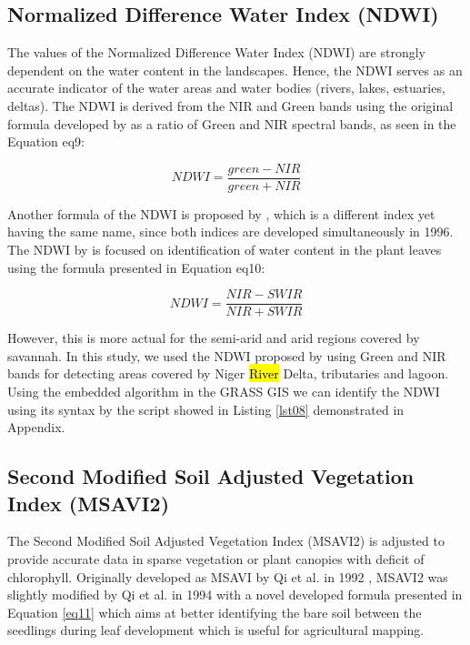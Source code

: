 \documentclass[jmse,article,submit,pdftex,moreauthors]{Definitions/mdpi}
\begin{document}
\subsection{Normalized Difference Water Index (NDWI)}

The values of the Normalized Difference Water Index (NDWI) are strongly dependent on the water content in the landscapes. Hence, the NDWI serves as an accurate indicator of the water areas and water bodies (rivers, lakes, estuaries, deltas). The NDWI is derived from the NIR and Green bands using the original formula developed by \cite{McFeeters} as a ratio of Green and NIR spectral bands, as seen in the Equation {eq9}: 

\begin{equation}\label{eq9}
	NDWI = \frac{green - NIR}{green + NIR}
\end{equation} 

Another formula of the NDWI is proposed by \cite{GAO1996257}, which is a different index yet having the same name, since both indices are developed simultaneously in 1996. The NDWI by \cite{GAO1996257} is focused on identification of water content in the plant leaves using the formula presented in Equation {eq10}: 

\begin{equation}\label{eq10}
	NDWI = \frac{NIR - SWIR}{NIR + SWIR}
\end{equation} 

However, this is more actual for the semi-arid and arid regions covered by savannah. In this study, we used the NDWI proposed by \cite{McFeeters} using Green and NIR bands for detecting areas covered by Niger \hl{River} Delta, tributaries and lagoon.  Using the embedded algorithm in the GRASS GIS we can identify the NDWI using its syntax by the script showed in Listing \ref{lst08} demonstrated in Appendix.

\subsection{Second Modified Soil Adjusted Vegetation Index (MSAVI2)}

The Second Modified Soil Adjusted Vegetation Index (MSAVI2) is adjusted to provide accurate data in sparse vegetation or plant canopies with deficit of chlorophyll. Originally developed as MSAVI by Qi et al. in 1992 \cite{QI1994119}, MSAVI2 was slightly modified by Qi et al. in 1994 \cite{Qi1994ExternalFC} with a novel developed formula presented in Equation \ref{eq11} which aims at better identifying the bare soil between the seedlings during leaf development which is useful for agricultural mapping. 
\end{document}
